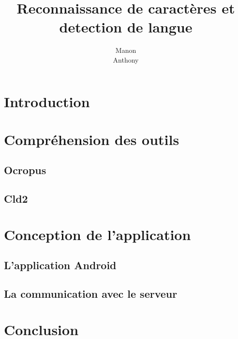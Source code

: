 \documentclass[12pt,titlepage,a4paper]{report}
\title{Reconnaissance de caractères et detection de langue}
\author{Manon \bsc{Ansart}\\ Anthony \bsc{Courtin}}
\begin{document}

	\dominitoc
	\tableofcontents

	\chapter{Introduction}
		

	\chapter{Compréhension des outils}
		\section{Ocropus}
		

		\section{Cld2}
		

	\chapter{Conception de l'application}
		\section{L'application Android}
		

		\section{La communication avec le serveur}
		

	\chapter{Conclusion}
		
\end{document}
